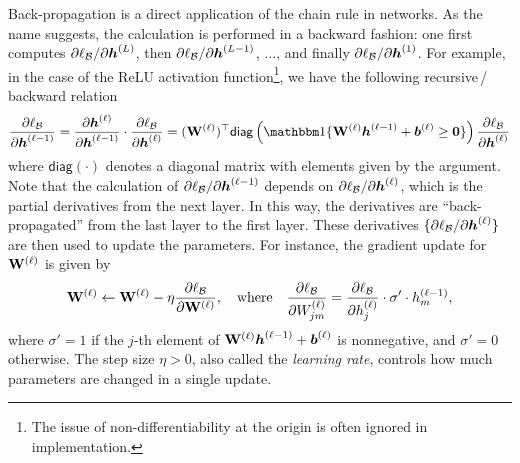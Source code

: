Back-propagation \citep{rumelhart1985learning} is a direct application of the chain rule in networks. As the name suggests, the calculation is performed in a backward fashion: one first computes $\partial \ell_{\mathcal{B}}/\partial \text{\boldmath $h$}^{(L)}$, then $\partial \ell_{\mathcal{B}}/\partial \text{\boldmath $h$}^{(L-1)}$, $\ldots$, and finally $\partial \ell_{\mathcal{B}}/\partial \text{\boldmath $h$}^{(1)}$. For example, in the case of the ReLU activation function\footnote{The issue of non-differentiability at the origin is often ignored in implementation.}, we have the following recursive$\,$/$\,$backward relation
\begin{equation}\label{eq:grad}
\frac{\partial \ell_{\cB}}{\partial \hh^{(\ell-1)}} =  \frac{\partial \hh^{(\ell)}}{\partial \hh^{(\ell-1)}} \cdot \frac{\partial \ell_{\cB}}{\partial \hh^{(\ell)}} = (\bW^{(\ell)})^\top \mathsf{diag}\left( \bbone\{\bW^{(\ell)} \hh^{(\ell-1)} + \bb^{(\ell)}  \ge \bm{0}\}  \right) \frac{\partial \ell_{\cB}}{\partial \hh^{(\ell)}}
\end{equation}
where $\mathsf{diag}(\cdot)$ denotes a diagonal matrix with elements given by the argument. Note that the calculation of $\partial \ell_{\mathcal{B}} / \partial \text{\boldmath $h$}^{(\ell-1)}$ depends on $\partial \ell_{\mathcal{B}} / \partial \text{\boldmath $h$}^{(\ell)}$, which is the partial derivatives from the next layer. In this way, the derivatives are ``back-propagated'' from the last layer to the first layer. These derivatives $\{\partial \ell_{\mathcal{B}} / \partial \text{\boldmath $h$}^{(\ell)}\}$ are then used to update the parameters. For instance, the gradient update for $\mathrm{\bf W}^{(\ell)}$ is given by
\begin{equation}\label{eq:Wupdate}
\mathrm{\bf W}^{(\ell)} \leftarrow \mathrm{\bf W}^{(\ell)} - \eta \frac{\partial \ell_{\mathcal{B}}}{\partial \mathrm{\bf W}^{(\ell)}}, \quad \text{where}\quad \frac{\partial \ell_{\mathcal{B}}}{\partial W_{jm}^{(\ell)}} = \frac{\partial \ell_{\mathcal{B}}}{\partial h_j^{(\ell)}} \cdot \sigma' \cdot h_m^{(\ell-1)},
\end{equation}
where $\sigma' = 1$ if the $j$-th element of $\mathrm{\bf W}^{(\ell)} \text{\boldmath $h$}^{(\ell-1)} + \text{\boldmath $b$}^{(\ell)}$ is nonnegative, and $\sigma' = 0$ otherwise. The step size $\eta >0$, also called the \textit{learning rate}, controls how much parameters are changed in a single update.

